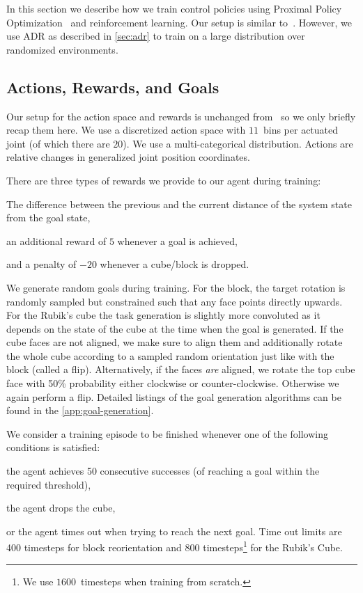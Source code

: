 In this section we describe how we train control policies using Proximal Policy Optimization~\cite{ppo} and reinforcement learning. Our setup is similar to~\cite{openai2018learning}. However, we use ADR as described in \autoref{sec:adr} to train on a large distribution over randomized environments.

\subsection{Actions, Rewards, and Goals}
Our setup for the action space and rewards is unchanged from~\cite{openai2018learning} so we only briefly recap them here. We use a discretized action space with $11$~bins per actuated joint (of which there are $20$). We use a multi-categorical distribution. Actions are relative changes in generalized joint position coordinates.

There are three types of rewards we provide to our agent during training:
\begin{enumerate*}[label=(\alph*)]
    \item The difference between the previous and the current distance of the system state from the goal state,
    \item an additional reward of $5$ whenever a goal is achieved,
    \item and a penalty of $-20$ whenever a cube/block is dropped.
\end{enumerate*}

We generate random goals during training. For the block, the target rotation is randomly sampled but constrained such that any face points directly upwards. For the Rubik's cube the task generation is slightly more convoluted as it depends on the state of the cube at the time when the goal is generated. If the cube faces are not aligned, we make sure to align them and additionally rotate the whole cube according to a sampled random orientation just like with the block (called a flip). Alternatively, if the faces \emph{are} aligned, we rotate the top cube face with 50\% probability either clockwise or counter-clockwise. Otherwise we again perform a flip. Detailed listings of the goal generation algorithms can be found in the \autoref{app:goal-generation}.

We consider a training episode to be finished whenever one of the following conditions is satisfied:
\begin{enumerate*}[label=(\alph*)]
    \item the agent achieves 50 consecutive successes (of reaching a goal within the required threshold),
    \item the agent drops the cube,
    \item or the agent times out when trying to reach the next goal. Time out limits are 400 timesteps for block reorientation and 800 timesteps\footnote{We use $1600$~timesteps when training from scratch.} for the Rubik's Cube.
\end{enumerate*}


